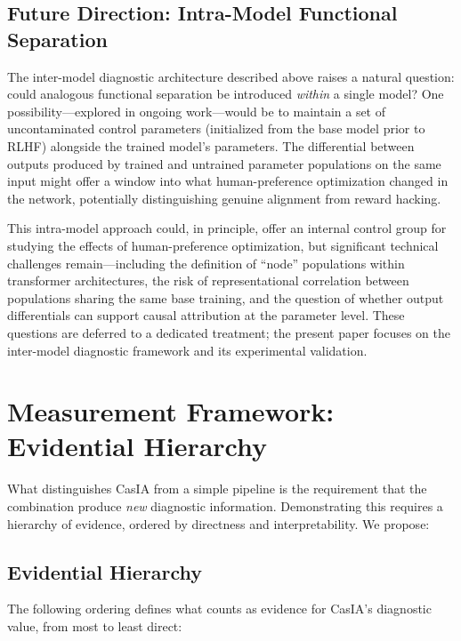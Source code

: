 \documentclass[11pt,a4paper]{article}
\theoremstyle{definition}
\begin{document}
\subsection{Future Direction: Intra-Model Functional Separation}
\label{subsec:intramodel}

The inter-model diagnostic architecture described above raises a natural question: could analogous functional separation be introduced \emph{within} a single model? One possibility---explored in ongoing work---would be to maintain a set of uncontaminated control parameters (initialized from the base model prior to RLHF) alongside the trained model's parameters. The differential between outputs produced by trained and untrained parameter populations on the same input might offer a window into what human-preference optimization changed in the network, potentially distinguishing genuine alignment from reward hacking.

This intra-model approach could, in principle, offer an internal control group for studying the effects of human-preference optimization, but significant technical challenges remain---including the definition of ``node'' populations within transformer architectures, the risk of representational correlation between populations sharing the same base training, and the question of whether output differentials can support causal attribution at the parameter level. These questions are deferred to a dedicated treatment; the present paper focuses on the inter-model diagnostic framework and its experimental validation.


\section{Measurement Framework: Evidential Hierarchy}
\label{sec:pid}

What distinguishes CasIA from a simple pipeline is the requirement that the combination produce \emph{new} diagnostic information. Demonstrating this requires a hierarchy of evidence, ordered by directness and interpretability. We propose:

\subsection{Evidential Hierarchy}
\label{subsec:hierarchy}

The following ordering defines what counts as evidence for CasIA's diagnostic value, from most to least direct:
\end{document}
